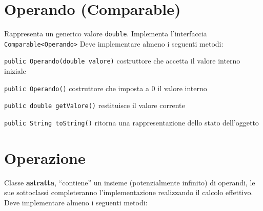 \documentclass[12pt]{article}
\begin{document}

\section{Operando (Comparable)}

Rappresenta un generico valore \texttt{double}. Implementa l'interfaccia \texttt{Comparable<Operando>}
Deve implementare almeno i seguenti metodi:

\begin{compactitem}
\item \texttt{public Operando(double valore)} costruttore  che accetta il valore interno iniziale
\item \texttt{public Operando()} costruttore  che imposta a 0 il valore interno
\item \texttt{public double getValore()} restituisce il valore corrente
\item \texttt{public String toString()} ritorna una rappresentazione dello stato dell'oggetto
\end{compactitem}


\section{Operazione}

Classe \textbf{astratta}, ``contiene'' un insieme (potenzialmente infinito) di operandi, le sue sottoclassi completeranno l'implementazione realizzando il calcolo effettivo.
Deve implementare almeno i seguenti metodi:
\end{document}
